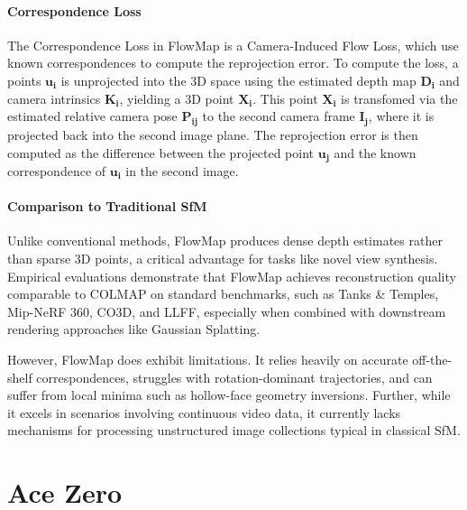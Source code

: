\paragraph{Correspondence Loss}
The Correspondence Loss in FlowMap is a Camera-Induced Flow Loss, which use known correspondences to compute the reprojection error. 
To compute the loss, a points $\mathbf{u_i}$ is unprojected into the 3D space using the estimated depth map $\mathbf{D_i}$ and camera intrinsics $\mathbf{K_i}$, yielding a 3D point $\mathbf{X_i}$.
This point $\mathbf{X_i}$ is transfomed via the estimated relative camera pose $\mathbf{P_{ij}}$ to the second camera frame $\mathbf{I_j}$, where it is projected back into the second image plane.
The reprojection error is then computed as the difference between the projected point $\mathbf{u_j}$ and the known correspondence of $\mathbf{u_i}$ in the second image.


\paragraph{Comparison to Traditional SfM}
Unlike conventional methods, FlowMap produces dense depth estimates rather than sparse 3D points, a critical advantage for tasks like novel view synthesis. 
Empirical evaluations demonstrate that FlowMap achieves reconstruction quality comparable to COLMAP on standard benchmarks, such as Tanks \& Temples, Mip-NeRF 360, CO3D, and LLFF, especially when combined with downstream rendering approaches like Gaussian Splatting.

However, FlowMap does exhibit limitations. It relies heavily on accurate off-the-shelf correspondences, struggles with rotation-dominant trajectories, and can suffer from local minima such as hollow-face geometry inversions. 
Further, while it excels in scenarios involving continuous video data, it currently lacks mechanisms for processing unstructured image collections typical in classical SfM.


\section{Ace Zero}\label{sec:acezero}
